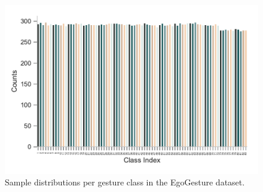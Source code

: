 \begin{figure}[H]
	\centering
	\includegraphics[width=0.8\linewidth]{figures/egogestureclassdist}
	\caption{Sample distributions per gesture class in the EgoGesture dataset.}
	\label{fig:egogestureclassdist}
\end{figure}

